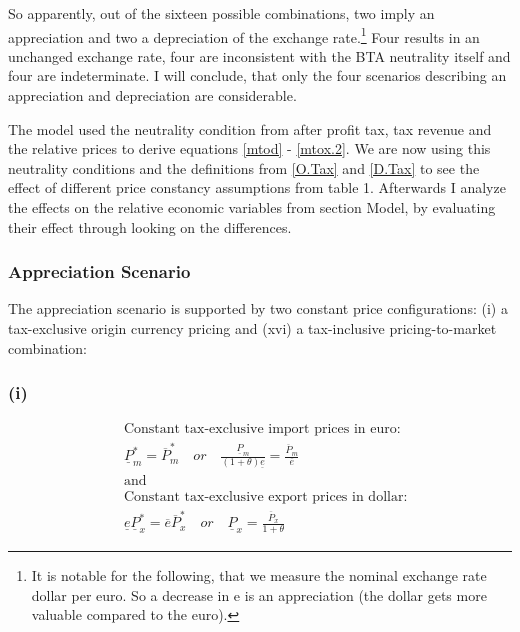 So apparently, out of the sixteen possible combinations, two imply an appreciation and two a depreciation of the exchange rate.\footnote{It is notable for the following, that we measure the nominal exchange rate dollar per euro. So a decrease in e is an appreciation (the dollar gets more valuable compared to the euro).} Four results in an unchanged exchange rate, four are inconsistent with the BTA neutrality itself and four are indeterminate. 
I will conclude, that only the four scenarios describing an appreciation and depreciation are considerable.

The model used the neutrality condition from after profit tax, tax revenue and the relative prices to derive equations \eqref{mtod} - \eqref{mtox.2}. We are now using this neutrality conditions and the definitions from \eqref{O.Tax} and \eqref{D.Tax} to see the effect of different price constancy assumptions from table 1. Afterwards I analyze the effects on the relative economic variables from section Model, by evaluating their effect through looking on the differences. 

\subsubsection{Appreciation Scenario}
The appreciation scenario is supported by two constant price configurations: (i) a tax-exclusive origin currency pricing and (xvi) a tax-inclusive pricing-to-market combination: 
\subsubsection*{(i)}
\begin{equation}\label{i}
\begin{aligned}
&\text{Constant tax-exclusive import prices in euro:}\\ &\underline P^*_m = \overline P^*_m \quad or \quad \frac{\underline P_m}{(1+\theta)\underline e} = \frac{\overline P_m}{\overline e} \\
&\text{and}\\
&\text{Constant tax-exclusive export prices in dollar:}\\  &\underline e \underline P^*_x = \overline e \overline P^*_x \quad or \quad \underline P_x = \frac{\overline P_x}{1+\theta}
\end{aligned}
\end{equation}

